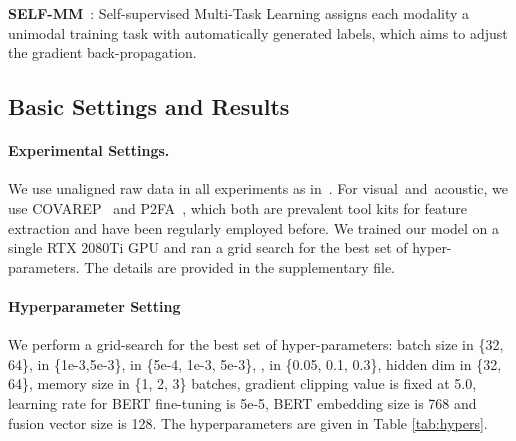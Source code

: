 \documentclass[11pt]{article}
\newcommand{\mv}{visual}
\newcommand{\ma}{acoustic}
\begin{document}
\textbf{SELF-MM}~\citep{yu2021learning}: Self-supervised Multi-Task Learning assigns each modality a unimodal training task with automatically generated labels, which aims to adjust the gradient back-propagation.



\subsection{Basic Settings and Results}
\paragraph{Experimental Settings.} 
We use unaligned raw data in all experiments as in~\citet{yu2021learning}.
For \mv~and~\ma, we use COVAREP~\citep{degottex2014covarep} and P2FA~\citep{yuan2008speaker}, which both are prevalent tool kits for feature extraction and have been regularly employed before.
We trained our model on a single RTX 2080Ti GPU and ran a grid search for the best set of hyper-parameters. 
The details are provided in the supplementary file.

\paragraph{Hyperparameter Setting}
We perform a grid-search for the best set of hyper-parameters: batch size in \{32, 64\},  in \{1e-3,5e-3\},  in \{5e-4, 1e-3, 5e-3\}, ,  in \{0.05, 0.1, 0.3\}, hidden dim in \{32, 64\}, memory size in \{1, 2, 3\} batches, gradient clipping value is fixed at 5.0, learning rate for BERT fine-tuning is 5e-5, BERT embedding size is 768 and fusion vector size is 128. The hyperparameters are given in Table \ref{tab:hypers}.

\begin{table}[ht!]
    \centering
{}
    \caption{Hyperparameters for best performance.}
    \label{tab:hypers}
\end{table} 
\end{document}
